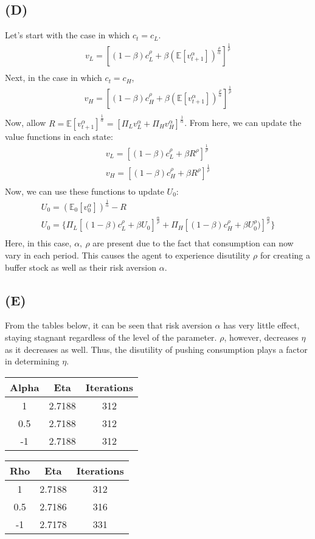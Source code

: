 \documentclass[10pt,a4paper]{article}
\begin{document}
  \subsection*{(D)}
    Let's start with the case in which $c_t = c_L$.
    \begin{gather*}
      v_L = [(1-\beta)c_L^{\rho} + \beta(\mathbb{E}[v_{t+1}^{\alpha}])^{\frac{\rho}{\alpha}}]^{\frac{1}{\rho}} \\
    \end{gather*}
    Next, in the case in which $c_t = c_H$,
    \begin{gather*}
      v_H = [(1-\beta)c_H^{\rho} + \beta(\mathbb{E}[v_{t+1}^{\alpha}])^{\frac{\rho}{\alpha}}]^{\frac{1}{\rho}} \\
    \end{gather*}
    Now, allow $R = \mathbb{E}[v_{t+1}^{\alpha}]^{\frac{1}{\alpha}} = [\Pi_Lv_L^{\alpha} + \Pi_Hv_H^{\alpha}]^{\frac{1}{\alpha}}$. From here, we can update the value functions in each state:
    \begin{gather*}
      v_L = [(1-\beta)c_L^{\rho} + \beta R^{\rho}]^{\frac{1}{\rho}} \\
      v_H = [(1-\beta)c_H^{\rho} + \beta R^{\rho}]^{\frac{1}{\rho}} \\
    \end{gather*}
    Now, we can use these functions to update $U_0$:
    \begin{gather*}
      U_0 = (\mathbb{E}_0[v_0^{\alpha}])^{\frac{1}{\alpha}} -R \\
      U_0 = \{\Pi_L[(1-\beta)c_L^{\rho} + \beta U_0]^{\frac{\alpha}{\rho}} + \Pi_H[(1-\beta)c_H^{\rho}+\beta U_0^{\rho})]^{\frac{\alpha}{\rho}}\} \\
    \end{gather*}
    Here, in this case, $\alpha, \ \rho$ are present due to the fact that consumption can now vary in each period. This causes the agent to experience disutility $\rho$ for creating a buffer stock as well as their risk aversion $\alpha$. 
  \subsection*{(E)}
  From the tables below, it can be seen that risk aversion $\alpha$ has very little effect, staying stagnant regardless of the level of the parameter. $\rho$, however, decreases $\eta$ as it decreases as well. Thus, the disutility of pushing consumption plays a factor in determining $\eta$.  
\newpage
    \begin{tabular}{ccc}
    Alpha & Eta    & Iterations \\
    \hline
    1     & 2.7188 & 312        \\
    0.5   & 2.7188 & 312        \\
    -1    & 2.7188 & 312       
    \end{tabular}
    \quad
    \begin{tabular}{ccc}
    Rho & Eta    & Iterations \\
    \hline
    1   & 2.7188 & 312        \\
    0.5 & 2.7186 & 316        \\
    -1  & 2.7178 & 331       
    \end{tabular}
\end{document}
